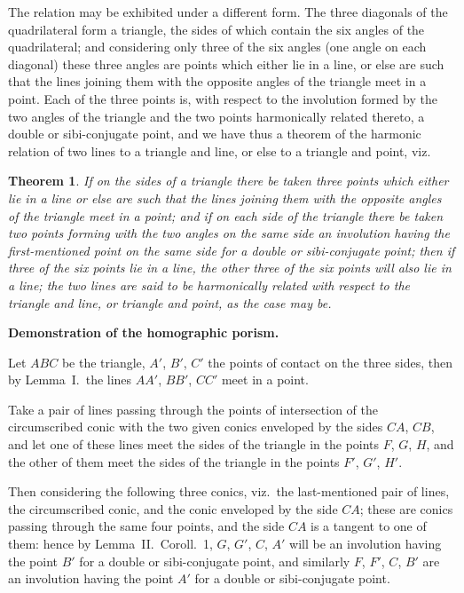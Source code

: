 \documentclass[11pt,a4paper]{book}
\newtheorem*{theorem}{Theorem}
\begin{document}
The relation may be exhibited under a different form. The three diagonals of the quadrilateral form a triangle, the sides of which contain the six angles of the quadrilateral; and considering only three of the six angles (one angle on each diagonal) these three angles are points which either lie in a line, or else are such that the lines joining them with the opposite angles of the triangle meet in a point. Each of the three points is, with respect to the involution formed by the two angles of the triangle and the two points harmonically related thereto, a double or sibi-conjugate point, and we have thus a theorem of the harmonic relation of two lines to a triangle and line, or else to a triangle and point, viz.

\begin{theorem}
If on the sides of a triangle there be taken three points which either lie in a line or else are such that the lines joining them with the opposite angles of the triangle meet in a point; and if on each side of the triangle there be taken two points forming with the two angles on the same side an involution having the first-mentioned point on the same side for a double or sibi-conjugate point; then if three of the six points lie in a line, the other three of the six points will also lie in a line; the two lines are said to be harmonically related with respect to the triangle and line, or triangle and point, as the case may be.
\end{theorem}

\textbf{Demonstration of the homographic porism.}

Let $ABC$ be the triangle, $A'$, $B'$, $C'$ the points of contact on the three sides, then by Lemma~I.\ the lines $AA'$, $BB'$, $CC'$ meet in a point.

Take a pair of lines passing through the points of intersection of the circumscribed conic with the two given conics enveloped by the sides $CA$, $CB$, and let one of these lines meet the sides of the triangle in the points $F$, $G$, $H$, and the other of them meet the sides of the triangle in the points $F'$, $G'$, $H'$.

Then considering the following three conics, viz.\ the last-mentioned pair of lines, the circumscribed conic, and the conic enveloped by the side $CA$; these are conics passing through the same four points, and the side $CA$ is a tangent to one of them: hence by Lemma~II.\ Coroll.~1, $G$, $G'$, $C$, $A'$ will be an involution having the point $B'$ for a double or sibi-conjugate point, and similarly $F$, $F'$, $C$, $B'$ are an involution having the point $A'$ for a double or sibi-conjugate point.
\end{document}
